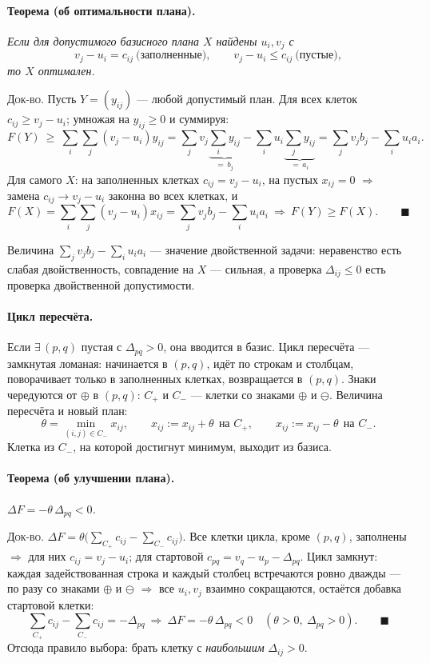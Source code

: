 \paragraph{Теорема (об оптимальности плана).}
\textit{Если для допустимого базисного плана $X$ найдены $u_i, v_j$ с}
\[
  v_j - u_i = c_{ij} \ \text{(заполненные)} , \qquad
  v_j - u_i \le c_{ij} \ \text{(пустые)} ,
\]
\textit{то $X$ оптимален.}

\textsc{Док-во.} Пусть $Y = (y_{ij})$ — любой допустимый план. Для всех клеток
$c_{ij} \ge v_j - u_i$; умножая на $y_{ij} \ge 0$ и суммируя:
\[
  F(Y) \ \ge\ \sum_{i}\sum_{j}(v_j - u_i)y_{ij}
       = \sum_{j} v_j \underbrace{\sum_{i} y_{ij}}_{=\,b_j}
       - \sum_{i} u_i \underbrace{\sum_{j} y_{ij}}_{=\,a_i}
       = \sum_j v_j b_j - \sum_i u_i a_i .
\]
Для самого $X$: на заполненных клетках $c_{ij} = v_j - u_i$, на пустых
$x_{ij} = 0$ $\Rightarrow$ замена $c_{ij} \to v_j - u_i$ законна во всех
клетках, и
\[
  F(X) = \sum_i\sum_j (v_j - u_i)x_{ij} = \sum_j v_j b_j - \sum_i u_i a_i
  \ \Rightarrow\ F(Y) \ge F(X) . \qquad \blacksquare
\]

Величина $\sum_j v_j b_j - \sum_i u_i a_i$ — значение двойственной задачи:
неравенство есть слабая двойственность, совпадение на $X$ — сильная, а проверка
$\Delta_{ij} \le 0$ есть проверка двойственной допустимости.

\paragraph{Цикл пересчёта.}
Если $\exists\,(p,q)$ пустая с $\Delta_{pq} > 0$, она вводится в базис. Цикл
пересчёта — замкнутая ломаная: начинается в $(p,q)$, идёт по строкам и
столбцам, поворачивает только в заполненных клетках, возвращается в $(p,q)$.
Знаки чередуются от $\oplus$ в $(p,q)$: $C_+$ и $C_-$ — клетки со знаками
$\oplus$ и $\ominus$. Величина пересчёта и новый план:
\[
  \theta = \min_{(i,j) \in C_-} x_{ij} ,
  \qquad
  x_{ij} := x_{ij} + \theta \ \ \text{на } C_+ , \qquad
  x_{ij} := x_{ij} - \theta \ \ \text{на } C_- .
\]
Клетка из $C_-$, на которой достигнут минимум, выходит из базиса.

\paragraph{Теорема (об улучшении плана).}
\textit{$\Delta F = -\theta\,\Delta_{pq} < 0$.}

\textsc{Док-во.}
$\Delta F = \theta\big(\sum_{C_+} c_{ij} - \sum_{C_-} c_{ij}\big)$.
Все клетки цикла, кроме $(p,q)$, заполнены $\Rightarrow$ для них
$c_{ij} = v_j - u_i$; для стартовой $c_{pq} = v_q - u_p - \Delta_{pq}$. Цикл
замкнут: каждая задействованная строка и каждый столбец встречаются ровно
дважды — по разу со знаками $\oplus$ и $\ominus$ $\Rightarrow$ все $u_i, v_j$
взаимно сокращаются, остаётся добавка стартовой клетки:
\[
  \sum_{C_+} c_{ij} - \sum_{C_-} c_{ij} = -\Delta_{pq}
  \ \Rightarrow\ \Delta F = -\theta\,\Delta_{pq} < 0
  \quad (\theta > 0,\ \Delta_{pq} > 0) . \qquad \blacksquare
\]
Отсюда правило выбора: брать клетку с \emph{наибольшим} $\Delta_{ij} > 0$.


